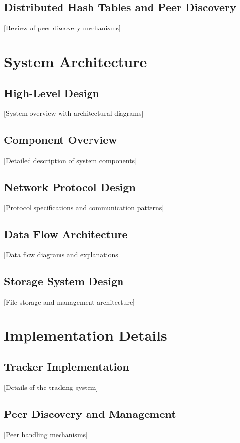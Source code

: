 \section{Distributed Hash Tables and Peer Discovery}
 [Review of peer discovery mechanisms]

\chapter{System Architecture}
\section{High-Level Design}
 [System overview with architectural diagrams]

\section{Component Overview}
 [Detailed description of system components]

\section{Network Protocol Design}
 [Protocol specifications and communication patterns]

\section{Data Flow Architecture}
 [Data flow diagrams and explanations]

\section{Storage System Design}
 [File storage and management architecture]

\chapter{Implementation Details}
\section{Tracker Implementation}
 [Details of the tracking system]

\section{Peer Discovery and Management}
 [Peer handling mechanisms]

